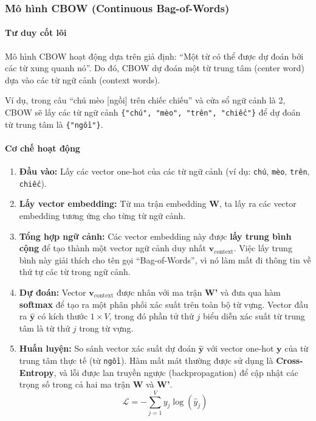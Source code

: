 \subsubsection{Mô hình CBOW (Continuous Bag-of-Words)}
\paragraph{Tư duy cốt lõi}
Mô hình CBOW hoạt động dựa trên giả định: “Một từ có thể được dự đoán bởi các từ xung quanh nó”. Do đó, CBOW dự đoán một từ trung tâm (center word) dựa vào các từ ngữ cảnh (context words).

Ví dụ, trong câu “chú mèo [ngồi] trên chiếc chiếu” và cửa sổ ngữ cảnh là 2, CBOW sẽ lấy các từ ngữ cảnh \texttt{\{"chú", "mèo", "trên", "chiếc"\}} để dự đoán từ trung tâm là \texttt{\{"ngồi"\}}.

\paragraph{Cơ chế hoạt động}
\begin{enumerate}
    \item \textbf{Đầu vào:} Lấy các vector one-hot của các từ ngữ cảnh (ví dụ: \texttt{chú}, \texttt{mèo}, \texttt{trên}, \texttt{chiếc}).
    \item \textbf{Lấy vector embedding:} Từ ma trận embedding \textbf{W}, ta lấy ra các vector embedding tương ứng cho từng từ ngữ cảnh.
    \item \textbf{Tổng hợp ngữ cảnh:} Các vector embedding này được \textbf{lấy trung bình cộng} để tạo thành một vector ngữ cảnh duy nhất $\mathbf{v}_{\text{context}}$. Việc lấy trung bình này giải thích cho tên gọi “Bag-of-Words”, vì nó làm mất đi thông tin về thứ tự các từ trong ngữ cảnh.
    \item \textbf{Dự đoán:} Vector $\mathbf{v}_{\text{context}}$ được nhân với ma trận \textbf{W'} và đưa qua hàm \textbf{softmax} để tạo ra một phân phối xác suất trên toàn bộ từ vựng. Vector đầu ra $\hat{\mathbf{y}}$ có kích thước $1 \times V$, trong đó phần tử thứ $j$ biểu diễn xác suất từ trung tâm là từ thứ $j$ trong từ vựng.
    \item \textbf{Huấn luyện:} So sánh vector xác suất dự đoán $\hat{\mathbf{y}}$ với vector one-hot $\mathbf{y}$ của từ trung tâm thực tế (từ \texttt{ngồi}). Hàm mất mát thường được sử dụng là \textbf{Cross-Entropy}, và lỗi được lan truyền ngược (backpropagation) để cập nhật các trọng số trong cả hai ma trận \textbf{W} và \textbf{W'}.
    $$ \mathcal{L} = -\sum_{j=1}^{V} y_j \log(\hat{y}_j) $$
\end{enumerate}

